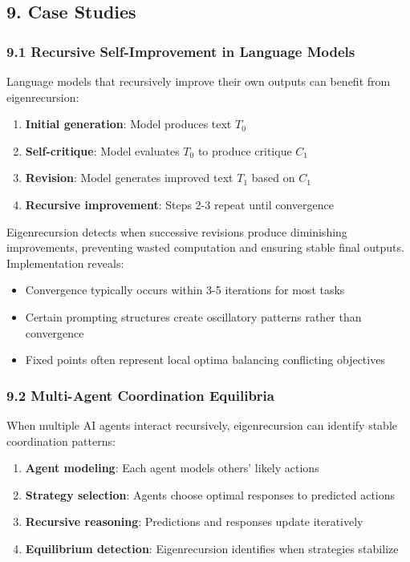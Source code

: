 \documentclass[
]{article}
\providecommand{\tightlist}{%
  \setlength{\itemsep}{0pt}\setlength{\parskip}{0pt}}
\begin{document}
\subsection{9. Case Studies}\label{case-studies}

\subsubsection{9.1 Recursive Self-Improvement in Language
Models}\label{recursive-self-improvement-in-language-models}

Language models that recursively improve their own outputs can benefit
from eigenrecursion:

\begin{enumerate}
\def\labelenumi{\arabic{enumi}.}
\tightlist
\item
  \textbf{Initial generation}: Model produces text \(T_{0}\)
\item
  \textbf{Self-critique}: Model evaluates \(T_{0}\) to produce critique
  \(C_{1}\)
\item
  \textbf{Revision}: Model generates improved text \(T_{1}\) based on
  \(C_{1}\)
\item
  \textbf{Recursive improvement}: Steps 2-3 repeat until convergence
\end{enumerate}

Eigenrecursion detects when successive revisions produce diminishing
improvements, preventing wasted computation and ensuring stable final
outputs. Implementation reveals:

\begin{itemize}
\tightlist
\item
  Convergence typically occurs within 3-5 iterations for most tasks
\item
  Certain prompting structures create oscillatory patterns rather than
  convergence
\item
  Fixed points often represent local optima balancing conflicting
  objectives
\end{itemize}

\subsubsection{9.2 Multi-Agent Coordination
Equilibria}\label{multi-agent-coordination-equilibria}

When multiple AI agents interact recursively, eigenrecursion can
identify stable coordination patterns:

\begin{enumerate}
\def\labelenumi{\arabic{enumi}.}
\tightlist
\item
  \textbf{Agent modeling}: Each agent models others' likely actions
\item
  \textbf{Strategy selection}: Agents choose optimal responses to
  predicted actions
\item
  \textbf{Recursive reasoning}: Predictions and responses update
  iteratively
\item
  \textbf{Equilibrium detection}: Eigenrecursion identifies when
  strategies stabilize
\end{enumerate}
\end{document}
